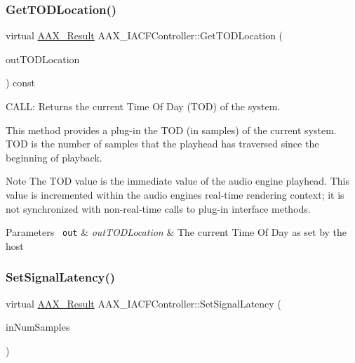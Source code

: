 \subsubsection{\texorpdfstring{GetTODLocation()}{GetTODLocation()}}
{\footnotesize\ttfamily virtual \mbox{\hyperlink{a00392_a4d8f69a697df7f70c3a8e9b8ee130d2f}{A\+A\+X\+\_\+\+Result}} A\+A\+X\+\_\+\+I\+A\+C\+F\+Controller\+::\+Get\+T\+O\+D\+Location (\begin{DoxyParamCaption}\item[{\mbox{\hyperlink{a00392_a46542a1dcccdcc3b4260a9926edf8a2a}{A\+A\+X\+\_\+\+C\+Time\+Of\+Day}} $\ast$}]{out\+T\+O\+D\+Location }\end{DoxyParamCaption}) const\hspace{0.3cm}{\ttfamily [pure virtual]}}



C\+A\+LL\+: Returns the current Time Of Day (T\+OD) of the system. 

This method provides a plug-\/in the T\+OD (in samples) of the current system. T\+OD is the number of samples that the playhead has traversed since the beginning of playback.

\begin{DoxyNote}{Note}
The T\+OD value is the immediate value of the audio engine playhead. This value is incremented within the audio engine\textquotesingle{}s real-\/time rendering context; it is not synchronized with non-\/real-\/time calls to plug-\/in interface methods.
\end{DoxyNote}

\begin{DoxyParams}[1]{Parameters}
\mbox{\texttt{ out}}  & {\em out\+T\+O\+D\+Location} & The current Time Of Day as set by the host \\
\hline
\end{DoxyParams}
\mbox{\label{a01637_aee931a52f15789d1b6a4e78cfd4f4961}} 
\subsubsection{\texorpdfstring{SetSignalLatency()}{SetSignalLatency()}}
{\footnotesize\ttfamily virtual \mbox{\hyperlink{a00392_a4d8f69a697df7f70c3a8e9b8ee130d2f}{A\+A\+X\+\_\+\+Result}} A\+A\+X\+\_\+\+I\+A\+C\+F\+Controller\+::\+Set\+Signal\+Latency (\begin{DoxyParamCaption}\item[{int32\+\_\+t}]{in\+Num\+Samples }\end{DoxyParamCaption})\hspace{0.3cm}{\ttfamily [pure virtual]}}



